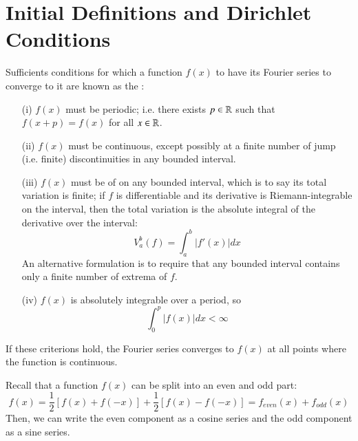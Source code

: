 \documentclass[12pt, a4paper, oneside, openright, titlepage]{book}
\begin{document}
\section{Initial Definitions and Dirichlet Conditions}


\begin{defn}
    Sufficients conditions for which a function $f(x)$ to have its Fourier series to converge to it are known as the : \begin{enumerate}
        \item[(i)] $f(x)$ must be periodic; i.e. there exists $p \in \mathbb R$ such that $f(x+p) = f(x)$ for all $x \in \mathbb R$.
        \item[(ii)] $f(x)$ must be continuous, except possibly at a finite number of jump (i.e. finite) discontinuities in any bounded interval.
        \item[(iii)] $f(x)$ must be of  on any bounded interval, which is to say its total variation is finite; if $f$ is differentiable and its derivative is Riemann-integrable on the interval, then the total variation is the absolute integral of the derivative over the interval: $$V_a^b(f) = \int_a^b|f'(x)|dx$$
            An alternative formulation is to require that any bounded interval contains only a finite number of extrema of $f$.
        \item[(iv)] $f(x)$ is absolutely integrable over a period, so $$\int_0^p|f(x)|dx < \infty$$
    \end{enumerate}
    If these criterions hold, the Fourier series converges to $f(x)$ at all points where the function is continuous.
\end{defn}

Recall that a function $f(x)$ can be split into an even and odd part: \begin{equation*}
    f(x) = \frac{1}{2}[f(x) + f(-x)] + \frac{1}{2}[f(x) - f(-x)] = f_{even}(x) + f_{odd}(x)
\end{equation*}
Then, we can write the even component as a cosine series and the odd component as a sine series.
\end{document}
